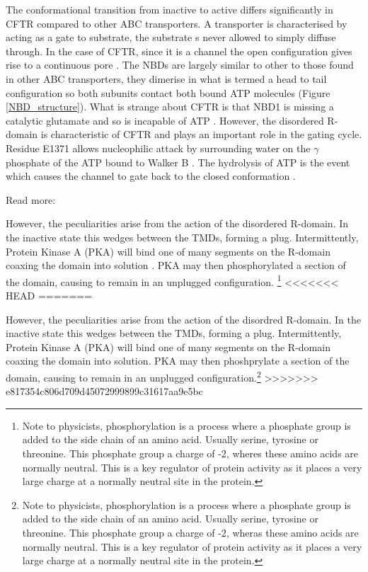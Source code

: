 The conformational transition from inactive to active differs significantly in CFTR compared to other ABC transporters. A transporter is characterised by acting as a gate to substrate, the substrate s never allowed to simply diffuse through. In the case of CFTR, since it is a channel the open configuration gives rise to a continuous pore \cite{linsdell2018}. The NBDs are largely similar to other to those found in other ABC transporters, they dimerise in what is termed a head to tail configuration so both subunits contact both bound ATP molecules \cite{} (Figure \ref{NBD_structure}). What is strange about CFTR is that NBD1 is missing a catalytic glutamate and so is incapable of ATP . However, the disordered R-domain is characteristic of CFTR and plays an important role in the gating cycle. Residue E1371 allows nucleophilic attack by surrounding water on the $\gamma$ phosphate  of the ATP bound to Walker B \cite{stratford2007}. The hydrolysis of ATP is the event which causes the channel to gate back to the closed conformation \cite{}. 

Read more: \cite{ramjeesingh1999}

However, the peculiarities arise from the action of the disordered R-domain. In the inactive state this wedges between the TMDs, forming a plug. Intermittently, Protein Kinase A (PKA) will bind one of many segments on the R-domain coaxing the domain into solution \cite{mihalyi2020}. PKA may then phosphorylated a section of the domain, causing to remain in an unplugged configuration. \footnote{Note to physicists, phosphorylation is a process where a phosphate group is added to the side chain of an amino acid. Usually serine, tyrosine or threonine. This phosphate group a charge of -2, wheres these amino acids are normally neutral. This is a key regulator of protein activity as it places a very large charge at a normally neutral site in the protein.}
<<<<<<< HEAD
=======

However, the peculiarities arise from the action of the disordred R-domain. In the inactive state this wedges between the TMDs, forming a plug. Intermittently, Protein Kinase A (PKA) will bind one of many segments on the R-domain coaxing the domain into solution. PKA may then phoshprylate a section of the domain, causing to remain in an unplugged configuration.\footnote{Note to physicists, phosphorylation is a process where a phosphate group is added to the side chain of an amino acid. Usually serine, tyrosine or threonine. This phosphate group a charge of -2, wheras these amino acids are normally neutral. This is a key regulator of protein activity as it places a very large charge at a normally neutral site in the protein.}
>>>>>>> e817354c806d709d45072999899c31617aa9e5bc

